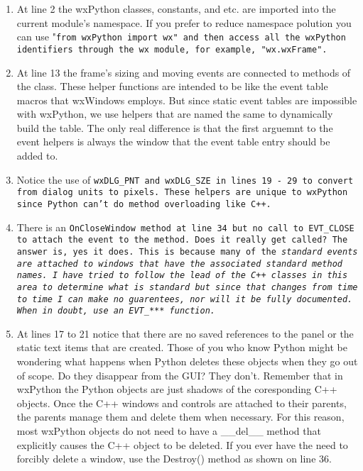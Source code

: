 \begin{enumerate}\itemsep=0pt
\item At line 2 the wxPython classes, constants, and etc. are imported
into the current module's namespace.  If you prefer to reduce
namespace polution you can use "\tt{from wxPython import wx}" and
then access all the wxPython identifiers through the wx module, for
example, "\tt{wx.wxFrame}".

\item At line 13 the frame's sizing and moving events are connected to
methods of the class.  These helper functions are intended to be like
the event table macros that wxWindows employs.  But since static event
tables are impossible with wxPython, we use helpers that are named the
same to dynamically build the table.  The only real difference is
that the first arguemnt to the event helpers is always the window that
the event table entry should be added to.

\item Notice the use of \tt{wxDLG_PNT} and \tt{wxDLG_SZE} in lines 19
- 29 to convert from dialog units to pixels.  These helpers are unique
to wxPython since Python can't do method overloading like C++.

\item There is an \tt{OnCloseWindow} method at line 34 but no call to
EVT_CLOSE to attach the event to the method.  Does it really get
called?  The answer is, yes it does.  This is because many of the
\em{standard} events are attached to windows that have the associated
\em{standard} method names.  I have tried to follow the lead of the
C++ classes in this area to determine what is \em{standard} but since
that changes from time to time I can make no guarentees, nor will it
be fully documented.  When in doubt, use an EVT_*** function.

\item At lines 17 to 21 notice that there are no saved references to
the panel or the static text items that are created.  Those of you
who know Python might be wondering what happens when Python deletes
these objects when they go out of scope.  Do they disappear from the GUI?  They
don't.  Remember that in wxPython the Python objects are just shadows of the
coresponding C++ objects.  Once the C++ windows and controls are
attached to their parents, the parents manage them and delete them
when necessary.  For this reason, most wxPython objects do not need to
have a __del__ method that explicitly causes the C++ object to be
deleted.  If you ever have the need to forcibly delete a window, use
the Destroy() method as shown on line 36.


\end{enumerate}
